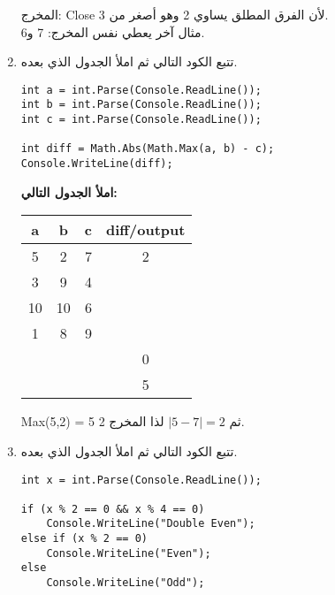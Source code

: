 ﻿\documentclass[12pt]{article}
\begin{document}
\begin{enumerate}[itemsep=2em]
\ifwithsols
\begin{boxSolution}
المخرج: \textenglish{Close} لأن الفرق المطلق يساوي 2 وهو أصغر من 3.\\
مثال آخر يعطي نفس المخرج: \textenglish{7} و\textenglish{6}.
\end{boxSolution}
\fi


\item
تتبع الكود التالي ثم املأ الجدول الذي بعده.

\begin{boxCode}
\begin{english}
\begin{verbatim}
int a = int.Parse(Console.ReadLine());
int b = int.Parse(Console.ReadLine());
int c = int.Parse(Console.ReadLine());

int diff = Math.Abs(Math.Max(a, b) - c);
Console.WriteLine(diff);
\end{verbatim}
\end{english}
\end{boxCode}

\textbf{املأ الجدول التالي:}

\begin{center}
\begin{tabular}{|c|c|c|c|}
\hline
\textbf{a} & \textbf{b} & \textbf{c} & \textbf{diff/output} \\
\hline
5 & 2 & 7 & 2 \\
\hline
3 & 9 & 4 &  \\
\hline
10 & 10 & 6 &  \\
\hline
1 & 8 & 9 &  \\
\hline
 &  &  & 0 \\
\hline
 &  &  & 5 \\
\hline
\end{tabular}
\end{center}

\ifwithsols
\begin{boxSolution}
\textenglish{Max(5,2) = 5} ثم \(\lvert 5 - 7 \rvert = 2\) لذا المخرج \textenglish{2}.
\end{boxSolution}
\fi

\clearpage
\item
تتبع الكود التالي ثم املأ الجدول الذي بعده.

\begin{boxCode}
\begin{english}
\begin{verbatim}
int x = int.Parse(Console.ReadLine());

if (x % 2 == 0 && x % 4 == 0)
    Console.WriteLine("Double Even");
else if (x % 2 == 0)
    Console.WriteLine("Even");
else
    Console.WriteLine("Odd");
\end{verbatim}
\end{english}
\end{boxCode}


\end{enumerate}
\end{document}
